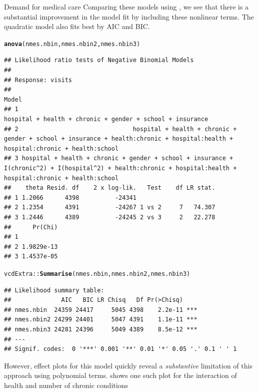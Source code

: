 \documentclass[11pt]{book}\usepackage[]{graphicx}\usepackage[]{color}
\makeatletter
\newcommand{\hlstd}[1]{\textcolor[rgb]{0.345,0.345,0.345}{#1}}%
\newcommand{\hlkwd}[1]{\textcolor[rgb]{0.737,0.353,0.396}{\textbf{#1}}}%
\newenvironment{kframe}{%
 \def\at@end@of@kframe{}%
 \ifinner\ifhmode%
  \def\at@end@of@kframe{\end{minipage}}%
  \begin{minipage}{\columnwidth}%
 \fi\fi%
 \def\FrameCommand##1{\hskip\@totalleftmargin \hskip-\fboxsep
 \colorbox{shadecolor}{##1}\hskip-\fboxsep
     \hskip-\linewidth \hskip-\@totalleftmargin \hskip\columnwidth}%
 \MakeFramed {\advance\hsize-\width
   \@totalleftmargin\z@ \linewidth\hsize
   \@setminipage}}%
 {\par\unskip\endMakeFramed%
 \at@end@of@kframe}
\newenvironment{knitrout}{}{} %
\renewenvironment{knitrout}{\small\renewcommand{\baselinestretch}{.85}}{} %
\makeatother
\begin{document}
\begin{Example}[nmes3]{Demand for medical care}
\begin{knitrout}
\end{knitrout}
Comparing these models using , we see that there is a substantial improvement in the
model fit by including these nonlinear terms.  The quadratic model also fits best by AIC and BIC.
\begin{knitrout}
\color{fgcolor}\begin{kframe}
\begin{alltt}
\hlkwd{anova}\hlstd{(nmes.nbin, nmes.nbin2, nmes.nbin3)}
\end{alltt}
\begin{verbatim}
## Likelihood ratio tests of Negative Binomial Models
## 
## Response: visits
##                                                                                                                                                            Model
## 1                                                                                                      hospital + health + chronic + gender + school + insurance
## 2                                hospital + health + chronic + gender + school + insurance + health:chronic + hospital:health + hospital:chronic + health:school
## 3 hospital + health + chronic + gender + school + insurance + I(chronic^2) + I(hospital^2) + health:chronic + hospital:health + hospital:chronic + health:school
##    theta Resid. df    2 x log-lik.   Test    df LR stat.
## 1 1.2066      4398          -24341                      
## 2 1.2354      4391          -24267 1 vs 2     7   74.307
## 3 1.2446      4389          -24245 2 vs 3     2   22.278
##      Pr(Chi)
## 1           
## 2 1.9829e-13
## 3 1.4537e-05
\end{verbatim}
\begin{alltt}
\hlstd{vcdExtra::}\hlkwd{Summarise}\hlstd{(nmes.nbin, nmes.nbin2, nmes.nbin3)}
\end{alltt}
\begin{verbatim}
## Likelihood summary table:
##              AIC   BIC LR Chisq   Df Pr(>Chisq)    
## nmes.nbin  24359 24417     5045 4398    2.2e-11 ***
## nmes.nbin2 24299 24401     5047 4391    1.1e-11 ***
## nmes.nbin3 24281 24396     5049 4389    8.5e-12 ***
## ---
## Signif. codes:  0 '***' 0.001 '**' 0.01 '*' 0.05 '.' 0.1 ' ' 1
\end{verbatim}
\end{kframe}
\end{knitrout}
However, effect plots for this model quickly reveal a \emph{substantive} limitation of this approach using polynomial terms.
 shows one such plot for the interaction of health and number of chronic conditions

\end{Example}
\end{document}
